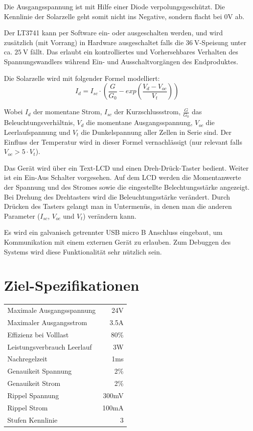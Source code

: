 \documentclass{article}
\begin{document}
Die  Ausgangsspannung ist  mit Hilfe  einer Diode  verpolungsgesch\"utzt.  Die
Kennlinie der Solarzelle geht somit nicht  ins Negative, sondern flacht bei 0V
ab.

Der   LT3741  kann   per  Software   ein-  oder   ausgeschalten  werden,   und
wird  zus\"atzlich   (mit  Vorrang)   in  Hardware  ausgeschaltet   falls  die
$\SI{36}{\volt}$-Speisung unter ca. $\SI{25}{\volt}$  f\"allt. Das erlaubt ein
kontrolliertes  und Vorhersehbares  Verhalten des  Spannungswandlers w\"ahrend
Ein- und Ausschaltvorg\"angen des Endproduktes.

Die Solarzelle wird mit folgender Formel modelliert:
\begin{equation}
I_d = I_{sc} \cdot \left(\frac{G}{G_0} - exp\left(\frac{V_d-V_{oc}}{V_t}\right)\right)
\end{equation}

Wobei   $I_{d}$   der   momentane  Strom,   $I_{sc}$   der   Kurzschlussstrom,
$\frac{G}{G_0}$    das   Beleuchtungsverh\"altnis,    $V_d$   die    momentane
Ausgangsspannung, $V_{oc}$  die Leerlaufspannung und $V_t$  die Dunkelspannung
aller Zellen in Serie sind. Der Einfluss der Temperatur wird in dieser Formel
vernachl\"assigt (nur relevant falls $V_{oc} > 5 \cdot V_t$).

Das   Ger\"at  wird   \"uber  ein   Text-LCD  und   einen  Dreh-Dr\"uck-Taster
bedient. Weiter  ist  ein  Ein-Aus  Schalter vorgesehen. Auf  dem  LCD  werden
die  Momentanwerte  der  Spannung  und  des  Stromes  sowie  die  eingestellte
Belechtungsst\"arke   angezeigt. Bei   Drehung   des  Drehtasters   wird   die
Beleuchtungsst\"arke ver\"andert. Durch  Dr\"ucken des Tasters gelangt  man in
Untermen\"us,  in denen  man  die anderen  Parameter  ($I_{sc}$, $V_{oc}$  und
$V_t$) ver\"andern kann.

Es  wird  ein  galvanisch  getrennter  USB  micro  B  Anschluss  eingebaut, um
Kommunikation mit einem externen Ger\"at zu erlauben. Zum Debuggen des Systems
wird diese Funktionalit\"at sehr n\"utzlich sein.


\section{Ziel-Spezifikationen}
\begin{center}
\begin{tabular}{lr}
    Maximale Ausgangsspannung	& 24V    \\
    Maximaler Ausgangsstrom		& 3.5A   \\
    Effizienz bei Volllast		& 80\%   \\
    Leistungsverbrauch Leerlauf	& 3W     \\
    Nachregelzeit				& 1ms    \\
    Genauikeit Spannung			& 2\%    \\
    Genauikeit Strom			& 2\%    \\
    Rippel Spannung				& 300mV  \\
    Rippel Strom				& 100mA  \\
    Stufen Kennlinie			& 3      \\
\end{tabular}
\end{center}
\end{document}
